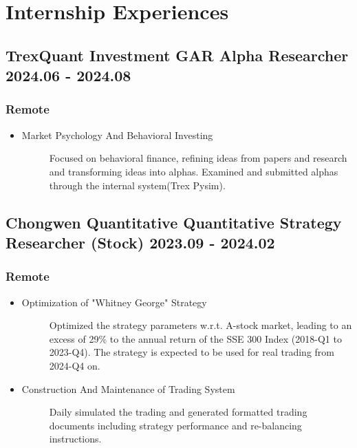 \documentclass[a4paper]{article}
\begin{document}
\hypertarget{intern-exp}{
    \section{Internship Experiences}
}
\subsection{TrexQuant Investment GAR Alpha Researcher 2024.06 - 2024.08}
\subsubsection{Remote}
\begin{itemize}
    \item\begin{description}
        \item[Market Psychology And Behavioral Investing] Focused on behavioral finance, refining ideas from papers and research and transforming ideas into alphas. Examined and submitted alphas through the internal system(Trex Pysim).
    \end{description}
\end{itemize}

\subsection{Chongwen Quantitative \normalfont\hfill Quantitative Strategy Researcher (Stock) \hfill 2023.09 - 2024.02}
\subsubsection{Remote}
\begin{itemize}%
    \item \begin{description}
        \item[Optimization of "Whitney George" Strategy] 
        Optimized the strategy parameters w.r.t. A-stock market, leading to an excess of 29\% to the annual return of the SSE 300 Index (2018-Q1 to 2023-Q4). The strategy is expected to be used for real trading from 2024-Q4 on.
    \end{description}
    \item \begin{description}
        \item[Construction And Maintenance of Trading System] 
        Daily simulated the trading and generated formatted trading documents including strategy performance and re-balancing instructions.
    \end{description}
\end{itemize}
\end{document}
